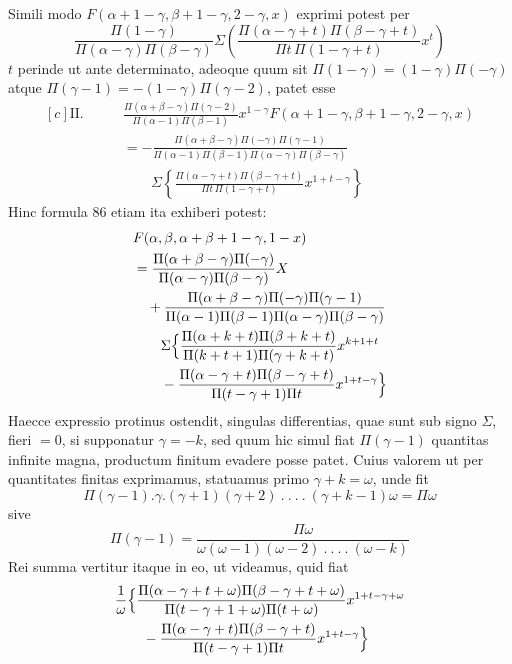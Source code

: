 Simili modo $F(\alpha+1-\gamma,\beta+1-\gamma,2-\gamma,x)$ exprimi potest per
\[
\frac{\Pi(1-\gamma)}{\Pi(\alpha-\gamma)\Pi(\beta-\gamma)}
\Sigma\left(\frac{\Pi(\alpha-\gamma+t)\Pi(\beta-\gamma+t)}{\Pi t\,\Pi(1-\gamma+t)}x^t\right)
\]
$t$ perinde ut ante determinato, adeoque quum sit $\Pi(1-\gamma)=(1-\gamma)\Pi(-\gamma)$ atque $\Pi(\gamma-1)=-(1-\gamma)\Pi(\gamma-2)$, patet esse
\[
\begin{aligned}[c]
\mathrm{II.}\qquad&\frac{\Pi(\alpha+\beta-\gamma)\Pi(\gamma-2)}{\Pi(\alpha-1)\Pi(\beta-1)}x^{1-\gamma}F(\alpha+1-\gamma,\beta+1-\gamma,2-\gamma,x)\\
&=-\frac{\Pi(\alpha+\beta-\gamma)\Pi(-\gamma)\Pi(\gamma-1)}{\Pi(\alpha-1)\Pi(\beta-1)\Pi(\alpha-\gamma)\Pi(\beta-\gamma)}
\\&\qquad\Sigma\left\{\frac{\Pi(\alpha-\gamma+t)\Pi(\beta-\gamma+t)}{\Pi t\,\Pi(1-\gamma+t)}x^{1+t-\gamma}\right\}
\end{aligned}
\]
Hinc formula 86 etiam ita exhiberi potest:
\[
\begin{aligned}[c]
&F(\alpha,\beta,\alpha+\beta+1-\gamma,1-x)\\
&=\frac{\Pi(\alpha+\beta-\gamma)\Pi(-\gamma)}{\Pi(\alpha-\gamma)\Pi(\beta-\gamma)}X\\
&\quad+\frac{\Pi(\alpha+\beta-\gamma)\Pi(-\gamma)\Pi(\gamma-1)}{\Pi(\alpha-1)\Pi(\beta-1)\Pi(\alpha-\gamma)\Pi(\beta-\gamma)}
\\&\qquad\Sigma\Bigl\{\frac{\Pi(\alpha+k+t)\Pi(\beta+k+t)}{\Pi(k+t+1)\Pi(\gamma+k+t)}x^{k+1+t}
\\&\qquad-\frac{\Pi(\alpha-\gamma+t)\Pi(\beta-\gamma+t)}{\Pi(t-\gamma+1)\Pi t}x^{1+t-\gamma}\Bigr\}
\end{aligned}
\]
Haecce expressio protinus ostendit, singulas differentias, quae sunt sub signo $\Sigma$,
fieri $=0$, si supponatur $\gamma=-k$, sed quum hic simul fiat $\Pi(\gamma-1)$ quantitas infinite magna, productum finitum evadere posse patet. Cuius valorem ut
per quantitates finitas exprimamus, statuamus primo $\gamma+k=\omega$, unde fit
\[
\Pi(\gamma-1).\gamma.(\gamma+1)(\gamma+2)\ .\ .\ .\ .\ (\gamma+k-1)\omega=\Pi\omega
\]
sive
\[
\Pi(\gamma-1)=\frac{\Pi\omega}{\omega(\omega-1)(\omega-2)\ .\ .\ .\ .\ (\omega-k)}
\]
Rei summa vertitur itaque in eo, ut videamus, quid fiat
\[
\begin{aligned}&\frac{1}{\omega}\Bigl\{\frac{\Pi(\alpha-\gamma+t+\omega)\Pi(\beta-\gamma+t+\omega)}{\Pi(t-\gamma+1+\omega)\Pi(t+\omega)}x^{1+t-\gamma+\omega}\\&\qquad-\frac{\Pi(\alpha-\gamma+t)\Pi(\beta-\gamma+t)}{\Pi(t-\gamma+1)\Pi t}x^{1+t-\gamma}\Bigr\}\end{aligned}
\]
